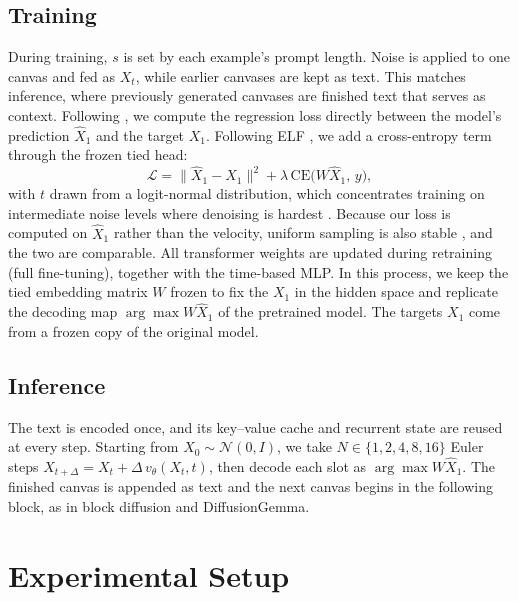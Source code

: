 \documentclass[11pt]{article}
\begin{document}
\subsection{Training}
During training, $s$ is set by each example's prompt length. Noise is applied to one canvas and fed as $X_t$, while earlier canvases are kept as text. This matches inference, where previously generated canvases are finished text that serves as context. Following \citet{hong2026alignment}, we compute the regression loss directly between the model's prediction $\hat{X}_1$ and the target $X_1$. Following ELF \citep{hu2026elf}, we add a cross-entropy term through the frozen tied head:
\begin{equation*}
\mathcal{L} = \big\|\hat{X}_1 - X_1\big\|^2 + \lambda\,\mathrm{CE}\big(W\hat{X}_1,\, y\big),
\end{equation*}
with $t$ drawn from a logit-normal distribution, which concentrates training on intermediate noise levels where denoising is hardest \citep{hu2026elf}. Because our loss is computed on $\hat{X}_1$ rather than the velocity, uniform sampling is also stable \citep{hong2026alignment}, and the two are comparable. All transformer weights are updated during retraining (full fine-tuning), together with the time-based MLP. In this process, we keep the tied embedding matrix $W$ frozen to fix the $X_1$ in the hidden space and replicate the decoding map $\arg\max W\hat{X}_1$ of the pretrained model. The targets $X_1$ come from a frozen copy of the original model.

\subsection{Inference}
The text is encoded once, and its key--value cache and recurrent state are reused at every step. Starting from $X_0\sim\mathcal{N}(0,I)$, we take $N\in\{1,2,4,8,16\}$ Euler steps $X_{t+\Delta} = X_t + \Delta\, v_\theta(X_t,t)$, then decode each slot as $\arg\max W\hat{X}_1$. The finished canvas is appended as text and the next canvas begins in the following block, as in block diffusion \citep{arriola2025block} and DiffusionGemma.

\section{Experimental Setup}
\end{document}

